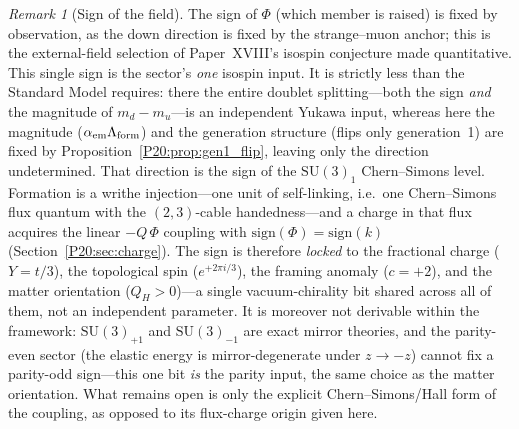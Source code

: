 \documentclass[11pt,a4paper]{article}
\theoremstyle{definition}\newtheorem{definition}[theorem]{Definition}
\theoremstyle{remark}
\newtheorem{remark}[theorem]{Remark}
\newcommand{\SU}{\mathrm{SU}}
\newcommand{\QH}{Q_H}
\newcommand{\alphaem}{\alpha_{\mathrm{em}}}
\begin{document}
\begin{remark}[Sign of the field]
\label{P20:rem:gen1_sign}
The sign of $\Phi$ (which member is raised) is fixed by observation, as
the down direction is fixed by the strange--muon anchor; this is the
external-field selection of Paper~XVIII's isospin conjecture
made quantitative. This single sign is the sector's \emph{one} isospin
input. It is strictly less than the Standard Model requires: there the
entire doublet splitting---both the sign \emph{and} the magnitude of
$m_d-m_u$---is an independent Yukawa input, whereas here the magnitude
($\alphaem\Lambda_{\rm form}$) and the generation structure (flips only
generation~1) are fixed by Proposition~\ref{P20:prop:gen1_flip}, leaving
only the direction undetermined. That direction is the sign of the
$\SU(3)_1$ Chern--Simons level. Formation is a writhe injection---one unit
of self-linking, i.e.\ one Chern--Simons flux quantum with the $(2,3)$-cable
handedness---and a charge in that flux acquires the linear $-Q\,\Phi$
coupling with $\mathrm{sign}(\Phi)=\mathrm{sign}(k)$
(Section~\ref{P20:sec:charge}). The sign is therefore \emph{locked} to the
fractional charge ($Y=t/3$), the topological spin ($e^{+2\pi i/3}$), the
framing anomaly ($c=+2$), and the matter orientation ($\QH>0$)---a single
vacuum-chirality bit shared across all of them, not an independent
parameter. It is moreover not derivable within the framework: $\SU(3)_{+1}$
and $\SU(3)_{-1}$ are exact mirror theories, and the parity-even sector (the
elastic energy is mirror-degenerate under $z\to-z$) cannot fix a parity-odd
sign---this one bit \emph{is} the parity input, the same choice as the
matter orientation. What remains open is only the explicit Chern--Simons/Hall
form of the coupling, as opposed to its flux-charge origin given here.
\end{remark}
\end{document}
